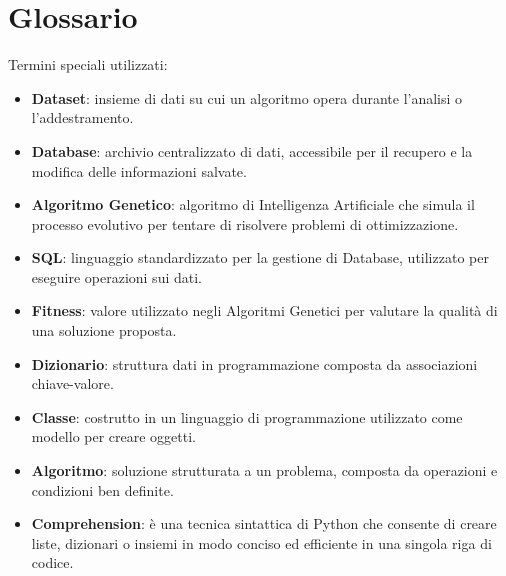 \documentclass{article}
\begin{document}
\section{Glossario}



Termini speciali utilizzati:

\begin{itemize}


    \item\textbf{Dataset}: insieme di dati su cui un algoritmo opera durante l'analisi o l'addestramento.

    \item\textbf{Database}: archivio centralizzato di dati, accessibile per il recupero e la modifica delle informazioni salvate.

    \item\textbf{Algoritmo Genetico}: algoritmo di Intelligenza Artificiale che simula il processo evolutivo per tentare di risolvere problemi di ottimizzazione.

    \item\textbf{SQL}: linguaggio standardizzato per la gestione di Database, utilizzato per eseguire operazioni sui dati.

    \item\textbf{Fitness}: valore utilizzato negli Algoritmi Genetici per valutare la qualità di una soluzione proposta.

    \item\textbf{Dizionario}: struttura dati in programmazione composta da associazioni chiave-valore.

    \item\textbf{Classe}: costrutto in un linguaggio di programmazione utilizzato come modello per creare oggetti.

    \item\textbf{Algoritmo}: soluzione strutturata a un problema, composta da operazioni e condizioni ben definite.
    
    \item\textbf{Comprehension}: è una tecnica sintattica di Python che consente di creare liste, dizionari o insiemi in modo conciso ed efficiente in una singola riga di codice.

\end{itemize}


\printindex
\end{document}
